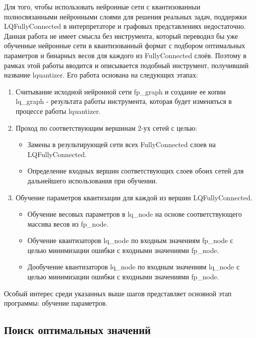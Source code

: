 Для того, чтобы использовать нейронные сети с квантизованныи полносвязанными нейронными слоями для решения реальных задач, поддержки LQFullyConnected в интерпретаторе и графовых представлениях недостаточно. Данная работа не имеет смысла без инструмента, который переводил бы уже обученные нейронные сети в квантизованный формат с подбором оптимальных параметров и бинарных весов для каждого из FullyConnected слоёв. Поэтому в рамках этой работы вводится и описывается подобный инструмент, получивший название lquantizer. Его работа основана на следующих этапах:
\begin{enumerate}[label=\arabic*.]
    \item Считывание исходной нейронной сети  fp\_graph и создание ее копии lq\_graph - результата работы инструмента, которая будет изменяться в процессе работы lquantizer.
    \item Проход по соответствующим вершинам 2-ух сетей с целью:
    \begin{itemize}
        \item Замены в результирующей сети всех FullyConnected слоев на LQFullyConnected.
        \item Определение входных вершин соответствующих слоев обоих сетей для дальнейшего использования при обучении.
    \end{itemize}
    \item Обучение параметров квантизации для каждой из вершин LQFullyConnected.
    \begin{itemize}
        \item Обучение весовых параметров в lq\_node на основе соответствующего массива весов из fp\_node.
        \item Обучение квантизаторов lq\_node по входным значениям fp\_node с целью минимизации ошибки с входными значениями fp\_node.
        \item Дообучение квантизаторов lq\_node по входным значениям lq\_node с целью минимизации ошибки с входными значениями fp\_node. 
    \end{itemize}
\end{enumerate}

Особый интерес среди указанных выше шагов представляет основной этап программы: обучение параметров.

\subsection{Поиск оптимальных значений}

